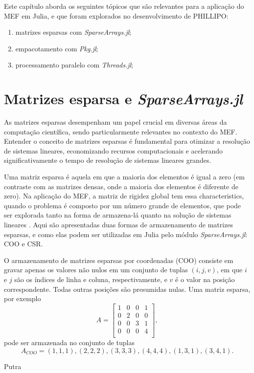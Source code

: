 Este capítulo aborda os seguintes tópicos que são relevantes para a aplicação do MEF em Julia, e que foram explorados no desenvolvimento de PHILLIPO:

\begin{enumerate}
    \item matrizes esparsas com \emph{SparseArrays.jl};
    \item empacotamento com \emph{Pkg.jl};
    \item processamento paralelo com \emph{Threads.jl};
\end{enumerate}



\section{Matrizes esparsa e \emph{SparseArrays.jl}}

As matrizes esparsas desempenham um papel crucial em diversas áreas da computação científica, sendo particularmente relevantes no contexto do MEF. Entender o conceito de matrizes esparsas é fundamental para otimizar a resolução de sistemas lineares, economizando recursos computacionais e acelerando significativamente o tempo de resolução de sistemas lineares grandes.

Uma matriz esparsa é aquela em que a maioria dos elementos é igual a zero (em contraste com as matrizes densas, onde a maioria dos elementos é diferente de zero). Na aplicação do MEF, a matriz de rigidez global tem essa characteristics, quando o problema é composto por um número grande de elementos, que pode ser explorada tanto na forma de armazena-lá quanto na solução de sistemas lineares \cite{LOGAN}. Aqui são apresentadas duas formas de armazenamento de matrizes esparsas, e como elas podem ser utilizadas em Julia pelo módulo \emph{SparseArrays.jl}: COO e CSR.


O armazenamento de matrizes esparsas por coordenadas (COO) consiste em gravar apenas os valores não nulos em um conjunto de tuplas $(i, j, v)$, em que $i$ e $j$ são os índices de linha e coluna, respectivamente, e $v$ é o valor na posição correspondente. Todas outras posições são presumidas nulas. Uma matriz esparsa, por exemplo
\begin{equation}
    A = 
    \begin{bmatrix}
        1 & 0 & 0 & 1 \\
        0 & 2 & 0 & 0 \\
        0 & 0 & 3 & 1 \\
        0 & 0 & 0 & 4 \\
    \end{bmatrix},
    \label{eq:coo_matrix}
\end{equation}
pode ser armazenada no conjunto de tuplas
\begin{equation}
    A_{COO} = {(1,1,1), (2,2,2), (3,3,3), (4,4,4), (1,3,1), (3,4,1)}.
    \label{eq:coo}
\end{equation}

Putra 
